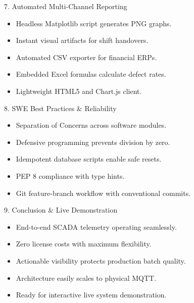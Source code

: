 \documentclass[aspectratio=169,11pt]{beamer}
\begin{document}
\begin{frame}{7. Automated Multi-Channel Reporting}
  \begin{itemize}\setlength{\itemsep}{0.8em}
    \item Headless Matplotlib script generates PNG graphs.
    \item Instant visual artifacts for shift handovers.
    \item Automated CSV exporter for financial ERPs.
    \item Embedded Excel formulas calculate defect rates.
    \item Lightweight HTML5 and Chart.js client.
  \end{itemize}
\end{frame}

\begin{frame}{8. SWE Best Practices \& Reliability}
  \begin{itemize}\setlength{\itemsep}{0.8em}
    \item Separation of Concerns across software modules.
    \item Defensive programming prevents division by zero.
    \item Idempotent database scripts enable safe resets.
    \item PEP 8 compliance with type hints.
    \item Git feature-branch workflow with conventional commits.
  \end{itemize}
\end{frame}

\begin{frame}{9. Conclusion \& Live Demonstration}
  \begin{itemize}\setlength{\itemsep}{0.8em}
    \item End-to-end SCADA telemetry operating seamlessly.
    \item Zero license costs with maximum flexibility.
    \item Actionable visibility protects production batch quality.
    \item Architecture easily scales to physical MQTT.
    \item Ready for interactive live system demonstration.
  \end{itemize}
\end{frame}
\end{document}
